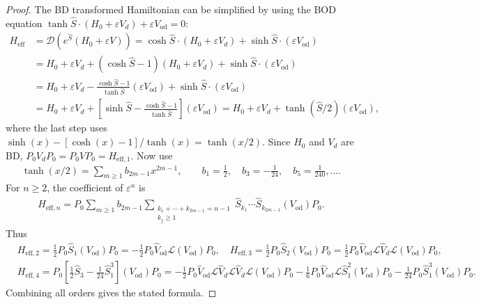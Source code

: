 \begin{proof}
The BD transformed Hamiltonian can be simplified by using the BOD equation $\tanh\hat S\cdot(H_0+\varepsilon V_d)+\varepsilon V_{\mathrm{od}}=0$:
\begin{align}
H_{\mathrm{eff}} &= \mathcal{D}\left(e^{\hat{S}}(H_0 + \varepsilon V)\right)
= \cosh\hat S\cdot(H_0+\varepsilon V_d)+\sinh\hat S\cdot(\varepsilon V_{\mathrm{od}})\\
&= H_0+\varepsilon V_d
+(\cosh\hat S-1)(H_0+\varepsilon V_d)
+\sinh\hat S\cdot(\varepsilon V_{\mathrm{od}})\\
&= H_0+\varepsilon V_d
-\frac{\cosh\hat S-1}{\tanh\hat S}(\varepsilon V_{\mathrm{od}})
+\sinh\hat S\cdot(\varepsilon V_{\mathrm{od}})\\
&= H_0+\varepsilon V_d+
\left[\sinh\hat S-\frac{\cosh\hat S-1}{\tanh\hat S}\right](\varepsilon V_{\mathrm{od}})
= H_0+\varepsilon V_d+\tanh(\hat S/2)(\varepsilon V_{\mathrm{od}}), \label{eq:tid_d_eq}
\end{align}
where the last step uses $\sinh(x) - [\cosh(x) - 1]/{\tanh(x)} = \tanh(x/2)$.
Since $H_0$ and $V_d$ are BD, $P_0 V_d P_0 = P_0 V P_0 = H_{\mathrm{eff},1}$.
Now use
\begin{align}
\tanh(x/2)=\sum_{m\geq1}b_{2m-1}x^{2m-1},
\qquad
b_1=\frac12,\quad b_3=-\frac1{24},\quad b_5=\frac1{240},\ldots .
\end{align}
For $n\geq2$, the coefficient of $\varepsilon^n$ is
\begin{align}
H_{\mathrm{eff},n}
=P_0\sum_{m\geq1}b_{2m-1}
\sum_{\substack{k_1+\cdots+k_{2m-1}=n-1\\ k_j\geq1}}
\hat S_{k_1}\cdots\hat S_{k_{2m-1}}(V_{\mathrm{od}})P_0 .
\end{align}
Thus
\begin{align}
&H_{\mathrm{eff},2}
=\frac12P_0\hat S_1(V_{\mathrm{od}})P_0
=-\frac12P_0\hat V_{\mathrm{od}}\mathcal L(V_{\mathrm{od}})P_0, \quad H_{\mathrm{eff},3}=\frac12P_0\hat S_2(V_{\mathrm{od}})P_0
=\frac12P_0\hat V_{\mathrm{od}}\mathcal L\hat V_d\mathcal L(V_{\mathrm{od}})P_0,\\
&H_{\mathrm{eff},4}\!\!
=\!\!P_0\left[\frac12\hat S_3-\frac1{24}\hat S_1^3\right](V_{\mathrm{od}})P_0 =-\frac12P_0\hat V_{\mathrm{od}}\mathcal L\hat V_d\mathcal L\hat V_d\mathcal L(V_{\mathrm{od}})P_0
-\frac16P_0\hat V_{\mathrm{od}}\mathcal L\hat S_1^2(V_{\mathrm{od}})P_0
-\frac1{24}P_0\hat S_1^3(V_{\mathrm{od}})P_0.
\end{align}
Combining all orders gives the stated formula.
\end{proof}

